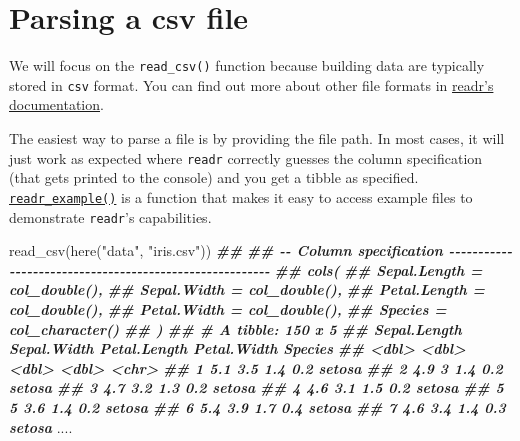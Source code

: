\documentclass[
]{book}
\newenvironment{Shaded}{\begin{snugshade}}{\end{snugshade}}
\newcommand{\DocumentationTok}[1]{\textcolor[rgb]{0.56,0.35,0.01}{\textbf{\textit{#1}}}}
\newcommand{\FunctionTok}[1]{\textcolor[rgb]{0.00,0.00,0.00}{#1}}
\newcommand{\NormalTok}[1]{#1}
\newcommand{\StringTok}[1]{\textcolor[rgb]{0.31,0.60,0.02}{#1}}
\begin{document}
\hypertarget{parsing-a-csv-file}{%
\section{Parsing a csv file}\label{parsing-a-csv-file}}

We will focus on the \texttt{read\_csv()} function because building data are typically stored in \texttt{csv} format. You can find out more about other file formats in \href{https://readr.tidyverse.org}{readr's documentation}.

The easiest way to parse a file is by providing the file path. In most cases, it will just work as expected where \texttt{readr} correctly guesses the column specification (that gets printed to the console) and you get a tibble as specified. \href{https://readr.tidyverse.org/reference/readr_example.html}{\texttt{readr\_example()}} is a function that makes it easy to access example files to demonstrate \texttt{readr}'s capabilities.

\begin{Shaded}
\begin{Highlighting}[]
\FunctionTok{read\_csv}\NormalTok{(}\FunctionTok{here}\NormalTok{(}\StringTok{"data"}\NormalTok{, }\StringTok{"iris.csv"}\NormalTok{))}
\DocumentationTok{\#\# }
\DocumentationTok{\#\# {-}{-} Column specification {-}{-}{-}{-}{-}{-}{-}{-}{-}{-}{-}{-}{-}{-}{-}{-}{-}{-}{-}{-}{-}{-}{-}{-}{-}{-}{-}{-}{-}{-}{-}{-}{-}{-}{-}{-}{-}{-}{-}{-}{-}{-}{-}{-}{-}{-}{-}{-}{-}{-}{-}{-}{-}{-}{-}{-}}
\DocumentationTok{\#\# cols(}
\DocumentationTok{\#\#   Sepal.Length = col\_double(),}
\DocumentationTok{\#\#   Sepal.Width = col\_double(),}
\DocumentationTok{\#\#   Petal.Length = col\_double(),}
\DocumentationTok{\#\#   Petal.Width = col\_double(),}
\DocumentationTok{\#\#   Species = col\_character()}
\DocumentationTok{\#\# )}
\DocumentationTok{\#\# \# A tibble: 150 x 5}
\DocumentationTok{\#\#    Sepal.Length Sepal.Width Petal.Length Petal.Width Species}
\DocumentationTok{\#\#           \textless{}dbl\textgreater{}       \textless{}dbl\textgreater{}        \textless{}dbl\textgreater{}       \textless{}dbl\textgreater{} \textless{}chr\textgreater{}  }
\DocumentationTok{\#\#  1          5.1         3.5          1.4         0.2 setosa }
\DocumentationTok{\#\#  2          4.9         3            1.4         0.2 setosa }
\DocumentationTok{\#\#  3          4.7         3.2          1.3         0.2 setosa }
\DocumentationTok{\#\#  4          4.6         3.1          1.5         0.2 setosa }
\DocumentationTok{\#\#  5          5           3.6          1.4         0.2 setosa }
\DocumentationTok{\#\#  6          5.4         3.9          1.7         0.4 setosa }
\DocumentationTok{\#\#  7          4.6         3.4          1.4         0.3 setosa }
\NormalTok{....}
\end{Highlighting}
\end{Shaded}
\end{document}
